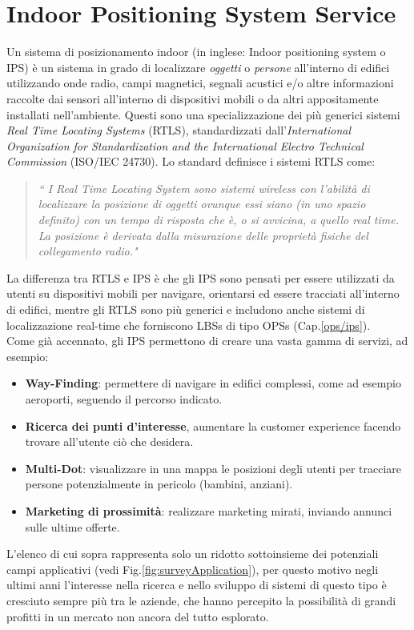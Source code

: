 \section{Indoor Positioning System Service}
\label{IPS}
Un sistema di posizionamento indoor (in inglese: Indoor positioning system o IPS) è un sistema in grado di localizzare \textit{oggetti} o \textit{persone} all'interno di edifici utilizzando onde radio, campi magnetici, segnali acustici e/o altre informazioni raccolte dai sensori all'interno di dispositivi mobili \cite{IPS} o da altri  appositamente installati nell'ambiente. Questi sono una specializzazione dei più generici sistemi  \textit{Real Time Locating Systems} (RTLS), standardizzati dall'\textit{International
Organization for Standardization and the International Electro Technical Commission} (ISO/IEC 24730). Lo standard definisce i sistemi RTLS come:
\begin{quotation}
	\textit{“ I Real Time Locating System sono sistemi wireless con l'abilità di localizzare la posizione di oggetti ovunque essi siano (in uno spazio definito) con un tempo di risposta che è, o si avvicina, a quello real time. La posizione è derivata dalla misurazione delle proprietà fisiche del collegamento radio."}
\end{quotation}
La differenza tra RTLS e IPS è che gli IPS sono pensati per essere utilizzati da utenti su dispositivi mobili per navigare, orientarsi ed essere tracciati all'interno di edifici, mentre gli RTLS sono più generici e includono anche sistemi di localizzazione real-time che forniscono LBSs di tipo OPSs (Cap.\ref{ops/ips}).\\
Come già accennato, gli IPS \cite{IPS2} permettono di creare una vasta gamma di servizi, ad esempio:
\begin{itemize}
	\item\textbf{Way-Finding}: permettere di navigare in edifici complessi, come ad esempio aeroporti, seguendo il percorso indicato.
	\item\textbf{Ricerca dei punti d'interesse}, aumentare la customer experience facendo trovare all’utente ciò che desidera.
	\item \textbf{Multi-Dot}: visualizzare in una mappa le posizioni degli utenti per tracciare persone potenzialmente in pericolo (bambini, anziani).
	\item \textbf{Marketing di prossimità}: realizzare marketing mirati, inviando annunci sulle ultime offerte.
\end{itemize}
L’elenco di cui sopra rappresenta solo un ridotto sottoinsieme dei potenziali campi applicativi (vedi Fig.\ref{fig:surveyApplication}), per questo motivo negli ultimi anni \cite{indoorThesis} l'interesse nella ricerca e nello sviluppo di sistemi di questo tipo è cresciuto sempre più tra le aziende, che hanno percepito la possibilità di grandi profitti in un mercato non ancora del tutto esplorato.
